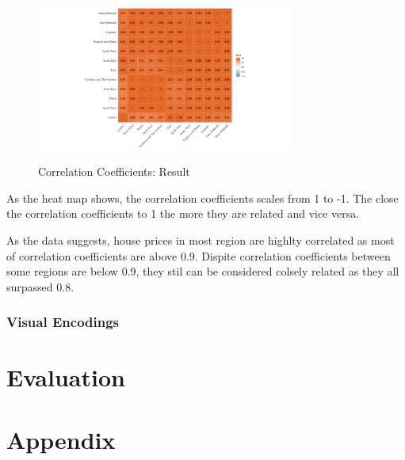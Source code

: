 \documentclass{article}
\begin{document}
\begin{figure}[H]
  \begin{minipage}[b]{1.0\linewidth}
    \centering
    \centerline{\includegraphics[width=8.5cm]{corHeatMap}}
    \centerline{Correlation Coefficients: Result}\medskip
  \end{minipage}
\end{figure}

As the heat map shows, the correlation coefficients scales from 1 to -1. The close the correlation coefficients 
to 1 the more they are related and vice versa.

As the data suggests, house prices in most region are highlty correlated as most of correlation coefficients 
are above 0.9. Dispite correlation coefficients between some regions are below 0.9, they stil can be 
considered colsely related as they all surpassed 0.8.

\subsubsection{Visual Encodings}




\section{Evaluation}




\vfill\pagebreak
\printbibliography


\vfill\pagebreak
\vfill\pagebreak

\section*{Appendix}
\end{document}
